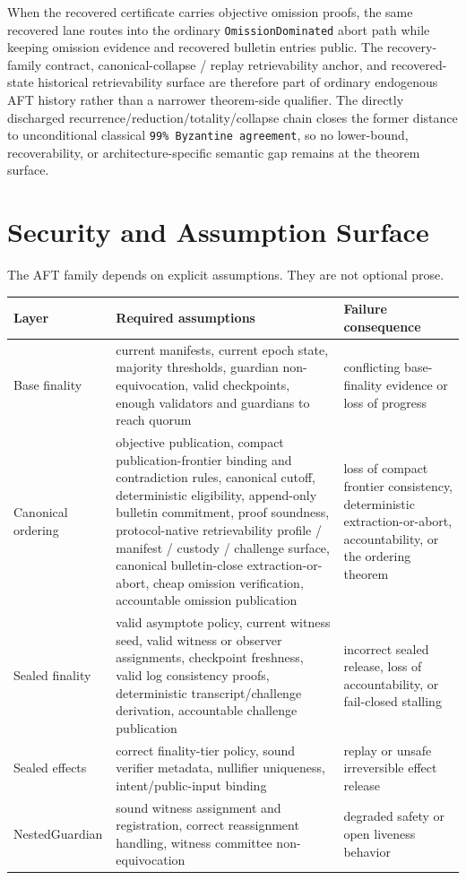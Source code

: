 \documentclass[11pt]{article}
\newcommand{\AFT}{\textsc{AFT}}
\newcommand{\code}[1]{\texttt{#1}}
\begin{document}
When the recovered certificate carries objective omission proofs, the same
recovered lane routes into the ordinary \code{OmissionDominated} abort path
while keeping omission evidence and recovered bulletin entries public. The
recovery-family contract, canonical-collapse / replay retrievability anchor, and
recovered-state historical retrievability surface are therefore part of ordinary endogenous
\AFT{} history rather than a narrower theorem-side qualifier. The directly
discharged recurrence/reduction/totality/collapse chain closes the former
distance to unconditional classical \code{99\% Byzantine agreement}, so no
lower-bound, recoverability, or architecture-specific semantic gap remains at
the theorem surface.

\section{Security and Assumption Surface}

The \AFT{} family depends on explicit assumptions. They are not optional prose.

\begin{center}
\small
\begin{tabularx}{\textwidth}{>{\raggedright\arraybackslash}p{} >{\raggedright\arraybackslash}p{} X}
\toprule
\textbf{Layer} & \textbf{Required assumptions} & \textbf{Failure consequence} \\
\midrule
Base finality & current manifests, current epoch state, majority thresholds, guardian non-equivocation, valid checkpoints, enough validators and guardians to reach quorum & conflicting base-finality evidence or loss of progress \\
Canonical ordering & objective publication, compact publication-frontier binding and contradiction rules, canonical cutoff, deterministic eligibility, append-only bulletin commitment, proof soundness, protocol-native retrievability profile / manifest / custody / challenge surface, canonical bulletin-close extraction-or-abort, cheap omission verification, accountable omission publication & loss of compact frontier consistency, deterministic extraction-or-abort, accountability, or the ordering theorem \\
Sealed finality & valid asymptote policy, current witness seed, valid witness or observer assignments, checkpoint freshness, valid log consistency proofs, deterministic transcript/challenge derivation, accountable challenge publication & incorrect sealed release, loss of accountability, or fail-closed stalling \\
Sealed effects & correct finality-tier policy, sound verifier metadata, nullifier uniqueness, intent/public-input binding & replay or unsafe irreversible effect release \\
NestedGuardian & sound witness assignment and registration, correct reassignment handling, witness committee non-equivocation & degraded safety or open liveness behavior \\
\bottomrule
\end{tabularx}
\end{center}
\end{document}
